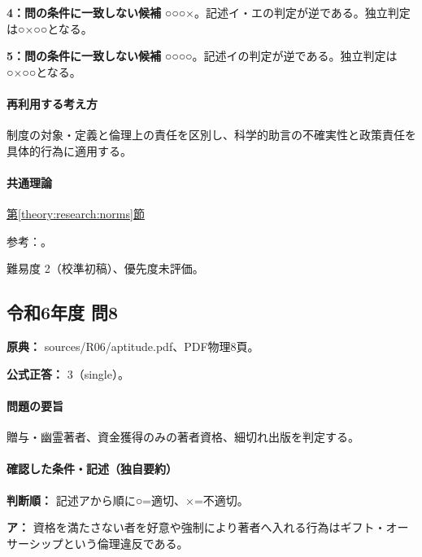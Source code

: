 \noindent\textbf{4：問の条件に一致しない候補} ○○○×。記述イ・エの判定が逆である。独立判定は○×○○となる。\par

\noindent\textbf{5：問の条件に一致しない候補} ○○○○。記述イの判定が逆である。独立判定は○×○○となる。\par

\paragraph{再利用する考え方} 制度の対象・定義と倫理上の責任を区別し、科学的助言の不確実性と政策責任を具体的行為に適用する。

\paragraph{共通理論} \hyperref[theory:research:norms]{第\ref*{theory:research:norms}節}

\par 参考：\cite{scj_code2013}。

\par 難易度 2（校準初稿）、優先度未評価。

\subsection{令和6年度 問8}
\label{q:r06-reg-apt-08}

\noindent\textbf{原典：} sources/R06/aptitude.pdf、PDF物理8頁。

\textbf{公式正答：} 3（single）。

\paragraph{問題の要旨} 贈与・幽霊著者、資金獲得のみの著者資格、細切れ出版を判定する。

\paragraph{確認した条件・記述（独自要約）}\mbox{}\par

\noindent\textbf{判断順：} 記述アから順に○=適切、×=不適切。\par

\noindent\textbf{ア：} 資格を満たさない者を好意や強制により著者へ入れる行為はギフト・オーサーシップという倫理違反である。\par

